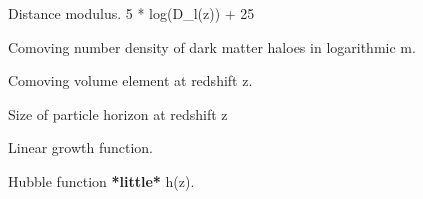 \documentclass[letterpaper,10pt,english]{sphinxmanual}
\begin{document}
\begin{fulllineitems}
\begin{fulllineitems}
\end{fulllineitems}


\begin{fulllineitems}
\label{PyCosmo:PyCosmo.cosmology_prevec.Cosmology.dist_mod}
Distance modulus.
5 * log(D\_l(z)) + 25

\end{fulllineitems}


\begin{fulllineitems}
\label{PyCosmo:PyCosmo.cosmology_prevec.Cosmology.dndlnm}
Comoving number density of dark matter haloes in logarithmic m.

\end{fulllineitems}


\begin{fulllineitems}
\label{PyCosmo:PyCosmo.cosmology_prevec.Cosmology.dvdz}
Comoving volume element at redshift z.

\end{fulllineitems}


\begin{fulllineitems}
\label{PyCosmo:PyCosmo.cosmology_prevec.Cosmology.eta}
Size of particle horizon at redshift z

\end{fulllineitems}


\begin{fulllineitems}
\label{PyCosmo:PyCosmo.cosmology_prevec.Cosmology.growth}
Linear growth function.

\end{fulllineitems}


\begin{fulllineitems}
\label{PyCosmo:PyCosmo.cosmology_prevec.Cosmology.h}
Hubble function \textbf{*little*} h(z).


\end{fulllineitems}
\end{fulllineitems}
\end{document}
